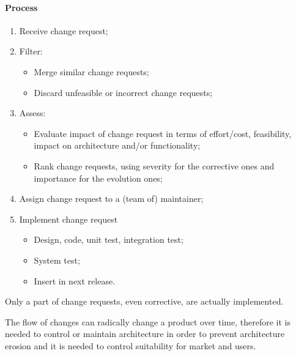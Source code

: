 \paragraph{Process}
\begin{enumerate}
\item Receive change request;
\item Filter:
\begin{itemize}
\item Merge similar change requests;
\item Discard unfeasible or incorrect change requests;
\end{itemize}
\item Assess:
\begin{itemize}
\item Evaluate impact of change request in terms of effort/cost, feasibility, impact on architecture and/or functionality;
\item Rank change requests, using severity for the corrective ones and importance for the evolution ones;
\end{itemize}
\item Assign change request to a (team of) maintainer;
\item Implement change request
\begin{itemize}
\item Design, code, unit test, integration test;
\item System test;
\item Insert in next release.
\end{itemize}
\end{enumerate}
Only a part of change requests, even corrective, are actually implemented.

The flow of changes can radically change a product over time, therefore it is needed to control or maintain architecture in order to prevent architecture erosion and it is needed to control suitability for market and users.

